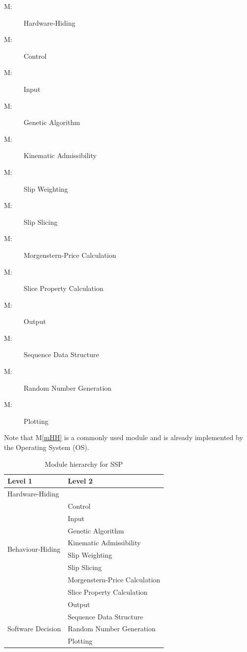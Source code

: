 \documentclass[12pt, titlepage]{article}
\newcommand{\progname}{SSP}
\newcounter{mnum}
\newcommand{\mthemnum}{M\themnum}
\newcommand{\mref}[1]{M\ref{#1}}
\begin{document}
\begin{description}
\item [ \mthemnum \label{mHH}:] Hardware-Hiding
\item [ \mthemnum \label{mControl}:] Control
\item [ \mthemnum \label{mInput}:] Input
\item [ \mthemnum \label{mGenAlg}:] Genetic
  Algorithm
\item [ \mthemnum \label{mKinAdm}:] Kinematic
  Admissibility
\item [ \mthemnum \label{mSlipWeight}:] Slip Weighting
\item [ \mthemnum \label{mSlipSlicer}:] Slip Slicing
\item [ \mthemnum \label{mMorgPrice}:]
  Morgenstern-Price Calculation
\item [ \mthemnum \label{mSliceProperty}:] Slice
  Property Calculation
\item [ \mthemnum \label{mOutput}:] Output
\item [ \mthemnum \label{mArrayOps}:] Sequence Data 
Structure
\item [ \mthemnum \label{mRandNum}:] Random Number     
Generation
\item [ \mthemnum \label{mPlot}:] Plotting
\end{description}

Note that \mref{mHH} is a commonly used module and is already
implemented by the Operating System (OS).

\begin{table}[h!]
\centering
\begin{tabular}{p{} p{} }
\toprule
\textbf{Level 1} & \textbf{Level 2} \\
\midrule

{Hardware-Hiding} & ~ \\
\midrule

\multirow{8}{0.3\textwidth}{Behaviour-Hiding} &
Control \\
& Input \\
& Genetic Algorithm \\
& Kinematic Admissibility \\
& Slip Weighting \\
& Slip Slicing \\
& Morgenstern-Price Calculation \\
& Slice Property Calculation \\
& Output \\
\midrule

\multirow{3}{0.3\textwidth}{Software Decision} &
Sequence Data Structure \\
& Random Number Generation \\
& Plotting \\
\bottomrule

\end{tabular}
\caption{Module hierarchy for \progname{}}
\label{Table:Decomp}
\end{table}
\end{document}
